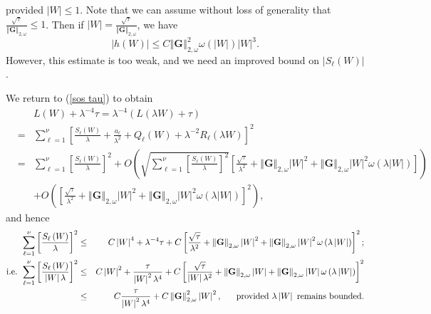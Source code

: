 \documentclass{amsart}
\theoremstyle{plain}
\numberwithin{equation}{section}
\begin{document}
provided $|W|\leq 1$. Note that we can assume without loss of generality
that $\frac{\sqrt{\tau }}{\left\Vert \mathbf{G}\right\Vert _{2,\omega }}\leq
1$. Then if $|W|=\frac{\sqrt{\tau }}{\left\Vert \mathbf{G}\right\Vert
_{2,\omega }}$, we have 
\begin{equation*}
\left\vert h\left( W\right) \right\vert \leq C\left\Vert \mathbf{G}%
\right\Vert _{2,\omega }^{2}\omega \left( \left\vert W\right\vert \right)
\left\vert W\right\vert ^{3}.
\end{equation*}%
However, this estimate is too weak, and we need an improved bound on $%
|S_{\ell }(W)|$.

We return to (\ref{sos tau}) to obtain%
\begin{eqnarray*}
&&L\left( W\right) +\lambda ^{-4}\tau =\lambda ^{-4}\left( L\left( \lambda
W\right) +\tau \right) \\
&=&\sum_{\ell =1}^{\nu }\left[ \frac{S_{\ell }\left( W\right) }{\lambda }+%
\frac{a_{\ell }}{\lambda ^{2}}+Q_{\ell }\left( W\right) +\lambda
^{-2}R_{\ell }\left( \lambda W\right) \right] ^{2} \\
&=&\sum_{\ell =1}^{\nu }\left[ \frac{S_{\ell }\left( W\right) }{\lambda }%
\right] ^{2}+O\left( \sqrt{\sum_{\ell =1}^{\nu }\left[ \frac{S_{\ell }\left(
W\right) }{\lambda }\right] ^{2}}\left[ \frac{\sqrt{\tau }}{\lambda ^{2}}%
+\left\Vert \mathbf{G}\right\Vert _{2,\omega }\left\vert W\right\vert
^{2}+\left\Vert \mathbf{G}\right\Vert _{2,\omega }\left\vert W\right\vert
^{2}\omega \left( \lambda \left\vert W\right\vert \right) \right] \right) \\
&&+O\left( \left[ \frac{\sqrt{\tau }}{\lambda ^{2}}+\left\Vert \mathbf{G}%
\right\Vert _{2,\omega }\left\vert W\right\vert ^{2}+\left\Vert \mathbf{G}%
\right\Vert _{2,\omega }\left\vert W\right\vert ^{2}\omega \left( \lambda
\left\vert W\right\vert \right) \right] ^{2}\right) ,
\end{eqnarray*}%
and hence%
\begin{eqnarray*}
\sum_{\ell =1}^{\nu }\left[ \frac{S_{\ell }\left( W\right) }{\lambda }\right]
^{2} &\leq &C\left\vert W\right\vert ^{4}+\lambda ^{-4}\tau +C\left[ \frac{%
\sqrt{\tau }}{\lambda ^{2}}+\left\Vert \mathbf{G}\right\Vert _{2,\omega
}\left\vert W\right\vert ^{2}+\left\Vert \mathbf{G}\right\Vert _{2,\omega
}\left\vert W\right\vert ^{2}\omega \left( \lambda \left\vert W\right\vert
\right) \right] ^{2}; \\
\text{i.e. }\sum_{\ell =1}^{\nu }\left[ \frac{S_{\ell }\left( W\right) }{%
\left\vert W\right\vert \lambda }\right] ^{2} &\leq &C\left\vert
W\right\vert ^{2}+\frac{\tau }{\left\vert W\right\vert ^{2}\lambda ^{4}}+C%
\left[ \frac{\sqrt{\tau }}{\left\vert W\right\vert \lambda ^{2}}+\left\Vert 
\mathbf{G}\right\Vert _{2,\omega }\left\vert W\right\vert +\left\Vert 
\mathbf{G}\right\Vert _{2,\omega }\left\vert W\right\vert \omega \left(
\lambda \left\vert W\right\vert \right) \right] ^{2} \\
&\leq &C\frac{\tau }{\left\vert W\right\vert ^{2}\lambda ^{4}}+C\left\Vert 
\mathbf{G}\right\Vert _{2,\omega }^{2}\left\vert W\right\vert ^{2},\ \ \ \ \ 
\text{provided }\lambda \left\vert W\right\vert \text{ remains bounded}.
\end{eqnarray*}%
\end{document}
